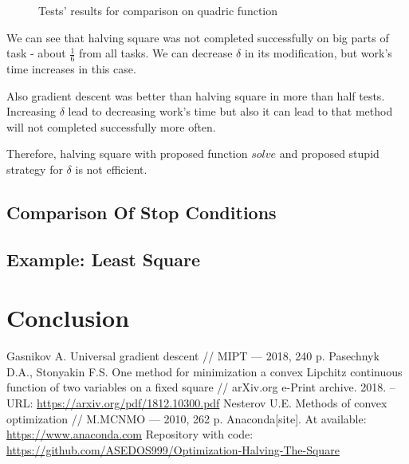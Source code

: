 \documentclass[12pt]{article}
\begin{document}
\begin{figure}[H]
\caption{Tests' results for comparison on quadric function}
\label{comp_pol}
\end{figure}

We can see that halving square was not completed successfully on big parts of task - about $\frac{1}{6}$ from all tasks. We can decrease $\delta$ in its modification, but work's time increases in this case.

Also gradient descent was better than halving square in more than half tests. Increasing $\delta$ lead to 
decreasing work's time but also it can lead to that method will not completed successfully more often.

Therefore, halving square with proposed function $solve$ and proposed stupid strategy for $\delta$ is not efficient.

\subsection{Comparison Of Stop Conditions}

\subsection{Example: Least Square}

\section{Conclusion}
\newpage
\begin{thebibliography}{3}
Gasnikov A.  Universal gradient descent // MIPT --- 2018, 240 p.
Pasechnyk D.A., Stonyakin F.S.  One method for minimization a convex Lipchitz continuous function of two variables on a fixed square // arXiv.org e-Print archive. 2018. – URL: \href{https://arxiv.org/pdf/1812.10300.pdf}{https://arxiv.org/pdf/1812.10300.pdf}
Nesterov U.E.  Methods of convex optimization // M.MCNMO --- 2010, 262 p.
Anaconda[site]. At available: \href{https://www.anaconda.com}{https://www.anaconda.com}
Repository with code: \href{https://github.com/ASEDOS999/Optimization-Halving-The-Square}{https://github.com/ASEDOS999/Optimization-Halving-The-Square}
\end{thebibliography}
\end{document}
